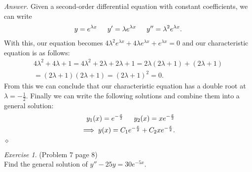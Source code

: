 \documentclass[12pt,oneside]{amsart}
\theoremstyle{definition}
\theoremstyle{remark}
\newtheorem{exer}{Exercise}
\numberwithin{equation}{exer}
\newenvironment{answer}{\bigskip\noindent\emph{Answer.}}{\hfill$\diamond$\newline}
\begin{document}
\begin{answer}
Given a second-order differential equation with constant coefficients, we can write 
\begin{align*}
    y = e^{\lambda x } \indent y' = \lambda e^{\lambda x } \indent y''= \lambda^2e^{\lambda x}.
\end{align*}
With this, our equation becomes $4\lambda^2e^{\lambda x} + 4 \lambda e^{\lambda x} +e^{\lambda x} = 0$ and our characteristic equation is as follows:
\begin{align*}
    4\lambda^2 + 4 \lambda  +1 = 4\lambda^2 + 2\lambda + 2\lambda +1 = 2\lambda(2\lambda +1)+(2\lambda +1) \\
    =(2\lambda +1)(2\lambda +1) = (2\lambda+1)^2 = 0.
\end{align*}
From this we can conclude that our characteristic equation has a double root at $\lambda = - \frac{1}{2}$. Finally we can write the following solutions and combine them into a general solution:
\begin{align*}
    y_1(x) = e^{-\frac{x}{2}} \indent y_2(x) = x e^{-\frac{x}{2}}\\
    \implies y(x) = C_1 e^{-\frac{x}{2}} + C_2  x e^{-\frac{x}{2}}.
\end{align*}
\end{answer}

\newpage



\begin{exer} (Problem 7 page 8) \\
\newline
Find the general solution of $y'' - 25y = 30 e^{-5x}$.
\end{exer}
\end{document}

